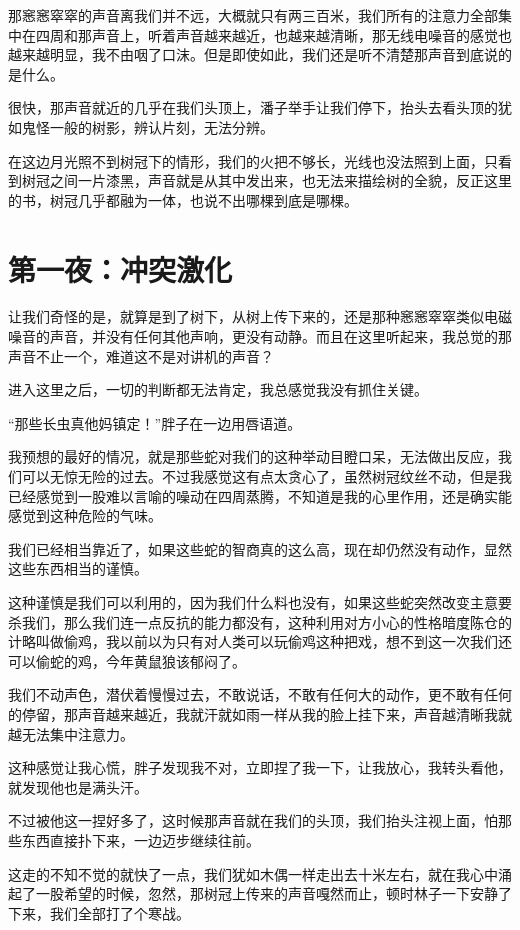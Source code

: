 那窸窸窣窣的声音离我们并不远，大概就只有两三百米，我们所有的注意力全部集中在四周和那声音上，听着声音越来越近，也越来越清晰，那无线电噪音的感觉也越来越明显，我不由咽了口沫。但是即使如此，我们还是听不清楚那声音到底说的是什么。

很快，那声音就近的几乎在我们头顶上，潘子举手让我们停下，抬头去看头顶的犹如鬼怪一般的树影，辨认片刻，无法分辨。

在这边月光照不到树冠下的情形，我们的火把不够长，光线也没法照到上面，只看到树冠之间一片漆黑，声音就是从其中发出来，也无法来描绘树的全貌，反正这里的书，树冠几乎都融为一体，也说不出哪棵到底是哪棵。

\chapter{第一夜：冲突激化}

让我们奇怪的是，就算是到了树下，从树上传下来的，还是那种窸窸窣窣类似电磁噪音的声音，并没有任何其他声响，更没有动静。而且在这里听起来，我总觉的那声音不止一个，难道这不是对讲机的声音？

进入这里之后，一切的判断都无法肯定，我总感觉我没有抓住关键。

“那些长虫真他妈镇定！”胖子在一边用唇语道。

我预想的最好的情况，就是那些蛇对我们的这种举动目瞪口呆，无法做出反应，我们可以无惊无险的过去。不过我感觉这有点太贪心了，虽然树冠纹丝不动，但是我已经感觉到一股难以言喻的噪动在四周蒸腾，不知道是我的心里作用，还是确实能感觉到这种危险的气味。

我们已经相当靠近了，如果这些蛇的智商真的这么高，现在却仍然没有动作，显然这些东西相当的谨慎。

这种谨慎是我们可以利用的，因为我们什么料也没有，如果这些蛇突然改变主意要杀我们，那么我们连一点反抗的能力都没有，这种利用对方小心的性格暗度陈仓的计略叫做偷鸡，我以前以为只有对人类可以玩偷鸡这种把戏，想不到这一次我们还可以偷蛇的鸡，今年黄鼠狼该郁闷了。

我们不动声色，潜伏着慢慢过去，不敢说话，不敢有任何大的动作，更不敢有任何的停留，那声音越来越近，我就汗就如雨一样从我的脸上挂下来，声音越清晰我就越无法集中注意力。

这种感觉让我心慌，胖子发现我不对，立即捏了我一下，让我放心，我转头看他，就发现他也是满头汗。

不过被他这一捏好多了，这时候那声音就在我们的头顶，我们抬头注视上面，怕那些东西直接扑下来，一边迈步继续往前。

这走的不知不觉的就快了一点，我们犹如木偶一样走出去十米左右，就在我心中涌起了一股希望的时候，忽然，那树冠上传来的声音嘎然而止，顿时林子一下安静了下来，我们全部打了个寒战。

